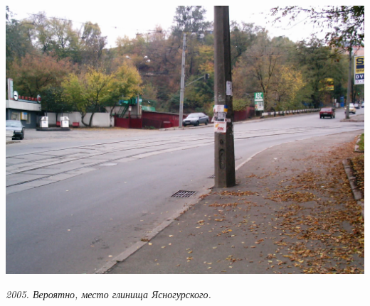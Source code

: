 
\newpage
\vspace*{\fill}
\begin{center}
\includegraphics[width=0.90\linewidth]{pix/imag0002.jpg}

\textit{2005. Вероятно, место глинища Ясногурского.}
\end{center} 

